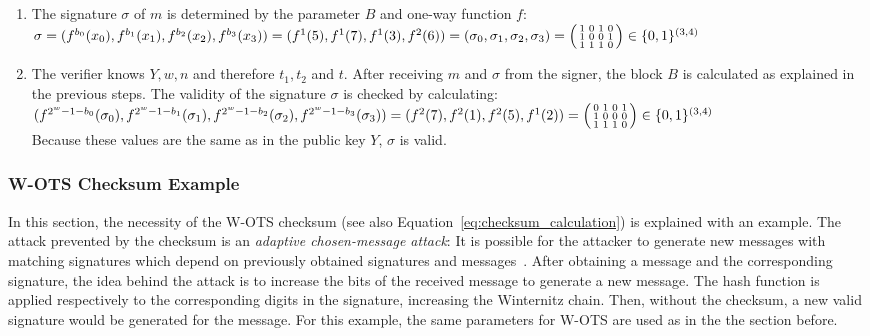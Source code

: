 \begin{enumerate}
\item The signature $\sigma$ of $m$ is determined by the parameter $B$ and one-way function $f$: \\ 
$\sigma = (f^{b_0}(x_0), f^{b_1}(x_1),f^{b_2}(x_2),f^{b_3}(x_3)) = (f^1(5),f^1(7),f^1(3),f^2(6)) = (\sigma_0, \sigma_1, \sigma_2, \sigma_3) = \\
\begin{psmallmatrix}
1 & 0 & 1 & 0 \\
1 & 0 & 0 & 1 \\
1 & 1 & 1 & 0
\end{psmallmatrix} \in \{0,1\}^{(3,4)} $

\item The verifier knows $Y, w, n$ and therefore $t_1, t_2$ and $t$. After receiving $m$ and $\sigma$ from the signer, the block $B$ is calculated as explained in the previous steps. The validity of the signature $\sigma$ is checked by calculating: \\
$( f^{2^w-1-b_0}(\sigma_0), f^{2^w-1-b_1}(\sigma_1), f^{2^w-1-b_2}(\sigma_2), f^{2^w-1-b_3}(\sigma_3)) = (f^2(7) , f^2(1), f^2(5), f^1(2)) = \\ \begin{psmallmatrix}
0 & 1 & 0 & 1 \\
1 & 0 & 0 & 0 \\
1 & 1 & 1 & 0
\end{psmallmatrix} \in \{0,1\}^{(3,4)} $
\\ Because these values are the same as in the public key $Y$, $\sigma$ is valid. 

\end{enumerate}

\subsubsection{W-OTS Checksum Example}
\label{sec:checksum_explained}
In this section, the necessity of the W-OTS checksum (see also Equation~\ref{eq:checksum_calculation}) is explained with an example. 
The attack prevented by the checksum is an \textit{adaptive chosen-message attack}: It is possible for the attacker to generate new messages with matching signatures which depend on previously obtained signatures and messages~\cite{cha:bg_signature_schemes_book_menezes2018_1997}. 
After obtaining a message and the corresponding signature, the idea behind the attack is to increase the bits of the received message to generate a new message. The hash function is applied respectively to the corresponding digits in the signature, increasing the Winternitz chain. Then, without the checksum, a new valid signature would be generated for the message. For this example, the same parameters for W-OTS are used as in the the section before. %

